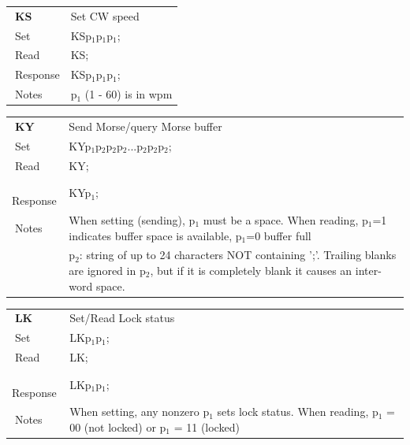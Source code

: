 \documentclass[12pt]{book}
\begin{document}
\begin{center}
\begin{tabular}{|p{2cm}|p{11cm}|}
\toprule
$\phantom{\Big|}$\textbf{\large KS} & Set CW speed \\\cline{1-2}
$\phantom{\Big|}${\large Set} & {KSp$_1$p$_1$p$_1$;} \\\hline
$\phantom{\Big|}${\large Read} & {KS;} \\\hline
$\phantom{\Big|}${\large Response} & {KSp$_1$p$_1$p$_1$;} \\\hline
$\phantom{\Big|}${\large Notes} & \multicolumn{1}{|p{11cm}|}{p$_1$ (1 - 60) is in wpm} \\
\bottomrule
\end{tabular}
\end{center}

\begin{center}
\begin{tabular}{|p{2cm}|p{11cm}|}
\toprule
$\phantom{\Big|}$\textbf{\large KY} & Send Morse/query Morse buffer \\\cline{1-2}
$\phantom{\Big|}${\large Set} & {KYp$_1$p$_2$p$_2$p$_2$...p$_2$p$_2$p$_2$;} \\\hline
$\phantom{\Big|}${\large Read} & {KY;} \\\hline
$\phantom{\Big|}${\large Response} & {KYp$_1$;} \\\hline
$\phantom{\Big|}${\large Notes} & \multicolumn{1}{|p{11cm}|}{When setting (sending), p$_1$ must be a space. When reading, p$_1$=1 indicates buffer space is available, p$_1$=0  buffer full} \\
 & \multicolumn{1}{|p{11cm}|}{p$_2$: string of up to 24 characters NOT containing ';'. Trailing blanks are ignored in p$_2$, but if it is completely blank it causes an inter-word space.} \\
\bottomrule
\end{tabular}
\end{center}

\begin{center}
\begin{tabular}{|p{2cm}|p{11cm}|}
\toprule
$\phantom{\Big|}$\textbf{\large LK} & Set/Read Lock status \\\cline{1-2}
$\phantom{\Big|}${\large Set} & {LKp$_1$p$_1$;} \\\hline
$\phantom{\Big|}${\large Read} & {LK;} \\\hline
$\phantom{\Big|}${\large Response} & {LKp$_1$p$_1$;} \\\hline
$\phantom{\Big|}${\large Notes} & \multicolumn{1}{|p{11cm}|}{When setting, any nonzero p$_1$ sets lock status. When reading, p$_1$ = 00 (not locked) or p$_1$ = 11 (locked)} \\
\bottomrule
\end{tabular}
\end{center}
\end{document}
